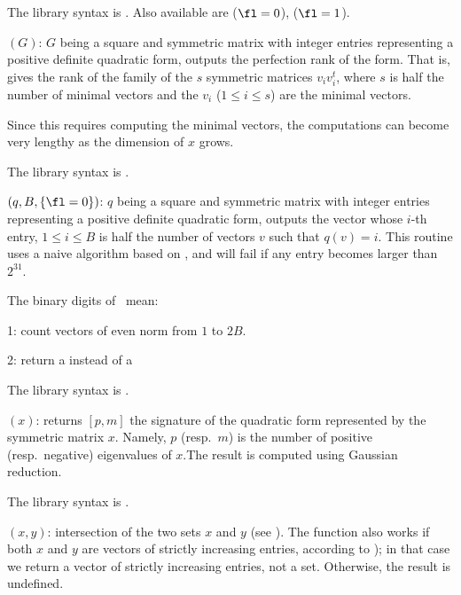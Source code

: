The library syntax is .
Also available are
 ($\fl=0$),
 ($\fl=1$).

$(G)$: \label{se:qfperfection}
$G$ being a square and symmetric matrix with
integer entries representing a positive definite quadratic form, outputs the
perfection rank of the form. That is, gives the rank of the family of the $s$
symmetric matrices $v_iv_i^t$, where $s$ is half the number of minimal
vectors and the $v_i$ ($1\le i\le s$) are the minimal vectors.

Since this requires computing the minimal vectors, the computations can
become very lengthy as the dimension of $x$ grows.

The library syntax is .

$(q,B,\{\fl=0\})$: \label{se:qfrep}
$q$ being a square and symmetric
matrix with integer entries representing a positive definite quadratic form,
outputs the vector whose $i$-th entry, $1 \leq i \leq B$ is half the number
of vectors $v$ such that $q(v) = i$. This routine uses a naive algorithm
based on , and will fail if any entry becomes larger than
$2^{31}$.

\noindent The binary digits of \fl\ mean:

\item 1: count vectors of even norm from $1$ to $2B$.

\item 2: return a  instead of a 

The library syntax is .

$(x)$: \label{se:qfsign}
returns $[p,m]$ the signature of the quadratic form represented by the
symmetric matrix $x$. Namely, $p$ (resp.~$m$) is the number of positive
(resp.~negative) eigenvalues of $x$.The result is computed using Gaussian
reduction.

The library syntax is .

$(x,y)$: \label{se:setintersect}intersection of the two sets $x$ and $y$ (see ).
The function also works if both $x$ and $y$ are vectors of strictly increasing
entries, according to \kbd{<}); in that case we return a vector of strictly
increasing entries, not a set. Otherwise, the result is undefined.

